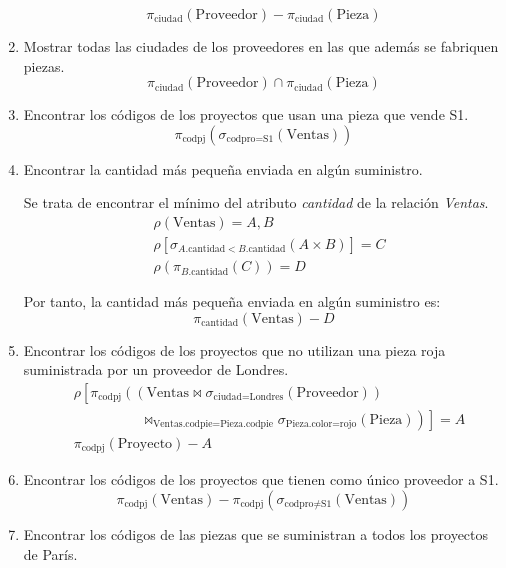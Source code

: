 \begin{ejercicio}
\begin{enumerate}
        \begin{equation*}
            \pi_{\text{ciudad}}(\text{Proveedor}) - \pi_{\text{ciudad}}(\text{Pieza})
        \end{equation*}
        \item Mostrar todas las ciudades de los proveedores en las que además se fabriquen piezas.
        \begin{equation*}
            \pi_{\text{ciudad}}(\text{Proveedor}) \cap \pi_{\text{ciudad}}(\text{Pieza})
        \end{equation*}
        \item Encontrar los códigos de los proyectos que usan una pieza que vende S1.
        \begin{equation*}
            \pi_{\text{codpj}}\left(\sigma_{\text{codpro} = \text{S1}}(\text{Ventas})\right)
        \end{equation*}

        \item Encontrar la cantidad más pequeña enviada en algún suministro.
        
        Se trata de encontrar el mínimo del atributo \emph{cantidad} de la relación \emph{Ventas}.
        \begin{align*}
            & \rho(\text{Ventas}) = A,B\\
            & \rho\left[\sigma_{A.\text{cantidad} < B.\text{cantidad}}(A \times B)\right] = C\\
            & \rho(\pi_{B.\text{cantidad}}(C)) = D
        \end{align*}

        Por tanto, la cantidad más pequeña enviada en algún suministro es:
        \begin{equation*}
            \pi_{\text{cantidad}}(\text{Ventas})-D
        \end{equation*}
        \item Encontrar los códigos de los proyectos que no utilizan una pieza roja suministrada por un proveedor de Londres.
        \begin{align*}
            &\rho\left[\pi_{\text{codpj}}\left(\left(\text{Ventas}\bowtie \sigma_{\text{ciudad}=\text{Londres}}(\text{Proveedor})\right)\right.\right.\\&\hspace{2cm}\left.\left.\bowtie_{\text{Ventas.codpie}=\text{Pieza.codpie}} \sigma_{\text{Pieza.color}=\text{rojo}}(\text{Pieza})\right)\right]=A\\
            & \pi_{\text{codpj}}(\text{Proyecto}) - A
        \end{align*}
        \item Encontrar los códigos de los proyectos que tienen como único proveedor a S1.
        \begin{equation*}
            \pi_{\text{codpj}}(\text{Ventas}) - \pi_{\text{codpj}}(\sigma_{\text{codpro}\neq \text{S1}}(\text{Ventas}))
        \end{equation*}
        \item Encontrar los códigos de las piezas que se suministran a todos los proyectos de París.
        

\end{enumerate}
\end{ejercicio}
